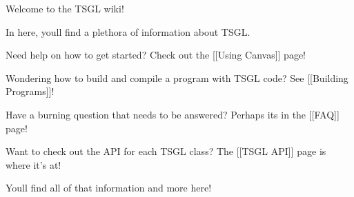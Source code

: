 Welcome to the T\+S\+G\+L wiki!

In here, you\textquotesingle{}ll find a plethora of information about T\+S\+G\+L.

Need help on how to get started? Check out the \mbox{[}\mbox{[}Using Canvas\mbox{]}\mbox{]} page!

Wondering how to build and compile a program with T\+S\+G\+L code? See \mbox{[}\mbox{[}Building Programs\mbox{]}\mbox{]}!

Have a burning question that needs to be answered? Perhaps its in the \mbox{[}\mbox{[}F\+A\+Q\mbox{]}\mbox{]} page!

Want to check out the A\+P\+I for each T\+S\+G\+L class? The \mbox{[}\mbox{[}T\+S\+G\+L A\+P\+I\mbox{]}\mbox{]} page is where it’s at!

You\textquotesingle{}ll find all of that information and more here! 